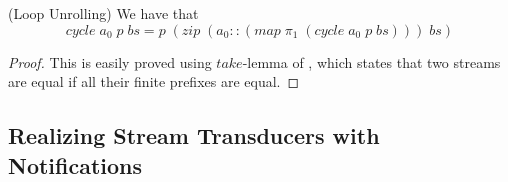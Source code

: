 \documentclass[preprint,natbib]{sigplanconf}
\begin{document}
\begin{lemma}{(Loop Unrolling)} We have that 
  \begin{displaymath}
    cycle\;a_0\;p\;bs = p\;(zip\;(a_0 :: (map\;\pi_1\;(cycle\;a_0\;p\;bs)))\;bs)
  \end{displaymath}
\end{lemma}

\begin{proof}
  This is easily proved using $take$-lemma of \citet{bird-wadler}, which
  states that two streams are equal if all their finite prefixes are
  equal.
\end{proof}


\subsection{Realizing Stream Transducers with Notifications}
\end{document}
